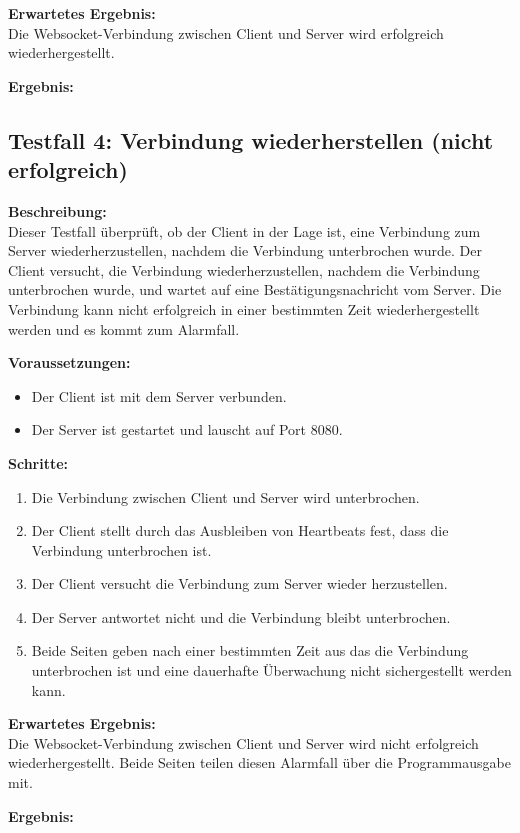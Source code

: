 \documentclass[thesis.tex]{subfiles}
\begin{document}
\textbf{Erwartetes Ergebnis:}\\
Die Websocket-Verbindung zwischen Client und Server wird erfolgreich wiederhergestellt.

\textbf{Ergebnis:}\\



\subsection*{Testfall 4: Verbindung wiederherstellen (nicht erfolgreich)}

\textbf{Beschreibung:}\\
Dieser Testfall überprüft, ob der Client in der Lage ist, eine Verbindung zum Server wiederherzustellen, nachdem die Verbindung unterbrochen wurde. Der Client versucht, die Verbindung wiederherzustellen, nachdem die Verbindung unterbrochen wurde, und wartet auf eine Bestätigungsnachricht vom Server. Die Verbindung kann nicht erfolgreich in einer bestimmten Zeit wiederhergestellt werden und es kommt zum Alarmfall.

\textbf{Voraussetzungen:}
\begin{itemize}
    \item Der Client ist mit dem Server verbunden.
    \item Der Server ist gestartet und lauscht auf Port 8080.
\end{itemize}

\textbf{Schritte:}
\begin{enumerate}
    \item Die Verbindung zwischen Client und Server wird unterbrochen.
    \item Der Client stellt durch das Ausbleiben von Heartbeats fest, dass die Verbindung unterbrochen ist.
    \item Der Client versucht die Verbindung zum Server wieder herzustellen.
    \item Der Server antwortet nicht und die Verbindung bleibt unterbrochen.
    \item Beide Seiten geben nach einer bestimmten Zeit aus das die Verbindung unterbrochen ist und eine dauerhafte Überwachung nicht sichergestellt werden kann.
\end{enumerate}

\textbf{Erwartetes Ergebnis:}\\
Die Websocket-Verbindung zwischen Client und Server wird nicht erfolgreich wiederhergestellt. Beide Seiten teilen diesen Alarmfall über die Programmausgabe mit.

\textbf{Ergebnis:}\\
\end{document}
